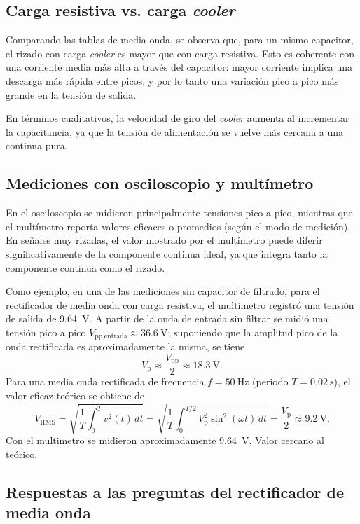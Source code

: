 \documentclass[a4paper,12pt]{article}
\begin{document}
\subsection{Carga resistiva vs. carga \emph{cooler}}

Comparando las tablas de media onda, se observa que, para un mismo capacitor, el rizado con carga \emph{cooler} es mayor que con carga resistiva. Esto es coherente con una corriente media más alta a través del capacitor: mayor corriente implica una descarga más rápida entre picos, y por lo tanto una variación pico a pico más grande en la tensión de salida.

En términos cualitativos, la velocidad de giro del \emph{cooler} aumenta al incrementar la capacitancia, ya que la tensión de alimentación se vuelve más cercana a una continua pura.

\subsection{Mediciones con osciloscopio y multímetro}

En el osciloscopio se midieron principalmente tensiones pico a pico, mientras que el multímetro reporta valores eficaces o promedios (según el modo de medición). En señales muy rizadas, el valor mostrado por el multímetro puede diferir significativamente de la componente continua ideal, ya que integra tanto la componente continua como el rizado.

Como ejemplo, en una de las mediciones sin capacitor de filtrado, para el rectificador de media onda con carga resistiva, el multímetro registró una tensión de salida de \SI{9,64}{\volt}. A partir de la onda de entrada sin filtrar se midió una tensión pico a pico \(V_{\text{pp,entrada}} \approx \SI{36,6}{\volt}\); suponiendo que la amplitud pico de la onda rectificada es aproximadamente la misma, se tiene
\[
V_{\text{p}} \approx \frac{V_{\text{pp}}}{2} \approx \SI{18,3}{\volt}.
\]
Para una media onda rectificada de frecuencia \(f = \SI{50}{\hertz}\) (periodo \(T = \SI{0,02}{\second}\)), el valor eficaz teórico se obtiene de
\[
V_{\text{RMS}} = \sqrt{\frac{1}{T}\int_0^{T} v^2(t)\, dt}
              = \sqrt{\frac{1}{T}\int_0^{T/2} V_{\text{p}}^{2} \sin^{2}(\omega t)\, dt}
              = \frac{V_{\text{p}}}{2}
              \approx \SI{9,2}{\volt}.
\]
Con el multimetro se midieron aproximadamente \SI{9,64}{\volt}. Valor cercano al teórico.

\subsection{Respuestas a las preguntas del rectificador de media onda}
\end{document}
